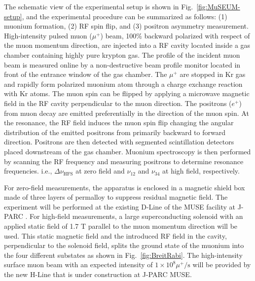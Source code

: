 The schematic view of the experimental setup is shown in
Fig.~\ref{fig:MuSEUM-setup}, and the experimental procedure
can be summarized as follows: (1) muonium formation, (2) RF
spin flip, and (3) positron asymmetry measurement.  High-intensity
pulsed muon ($\mu^+$) beam, 100\% backward polarized with
respect of the muon momentum direction, are injected into
a RF cavity located inside a gas chamber containing highly
pure krypton gas.  The profile of the incident muon beam
is measured online by a non-destructive beam profile monitor
located in front of the entrance window of the gas chamber.
The $\mu^+$ are stopped in Kr gas and rapidly form polarized
muonium atom through a charge exchange reaction with Kr atoms.
The muon spin can be flipped by applying a microwave magnetic
field in the RF cavity perpendicular to the muon direction.
The positrons ($e^+$) from muon decay are emitted preferentially
in the direction of the muon spin.  At the resonance, the
RF field induces the muon spin flip changing the angular
distribution of the emitted positrons from primarily backward
to forward direction.  Positrons are then detected with
segmented scintillation detectors placed downstream of the
gas chamber.  Muonium spectroscopy is then performed by
scanning the RF frequency and measuring positrons to determine
resonance frequencies. i.e., $\Delta \nu_{\text{HFS}}$
at zero field and $\nu_{12}$ and $\nu_{34}$ at high field,
respectively.


For zero-field measurements, the apparatus is enclosed in a
magnetic shield box made of three layers of permalloy to
suppress residual magnetic field.  The experiment will be
performed at the existing D-Line of the MUSE facility at
J-PARC \cite{Higemoto:2017}.  For high-field measurements,
a large superconducting solenoid with an applied static field
of 1.7 T parallel to the muon momentum direction will be used.
This static magnetic field and the introduced RF field in
the cavity, perpendicular to the solenoid field, splits the
ground state of the muonium into the four different substates
as shown in Fig.~\ref{fig:BreitRabi}.  The high-intensity
surface muon beam with an expected intensity of 
$1\times 10^{8} \mu^+/{\text{s}}$ will be provided by the new
H-Line that is under construction at J-PARC MUSE.


